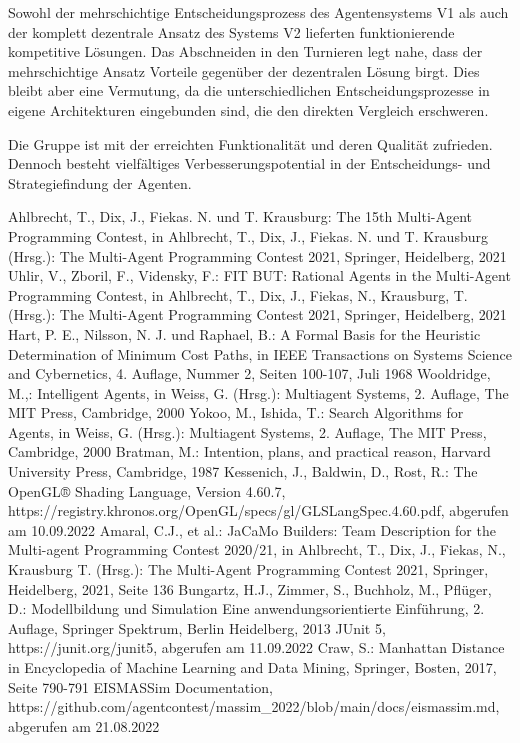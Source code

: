 \documentclass[runningheads]{llncs}
\begin{document}
	Sowohl der mehrschichtige Entscheidungsprozess des Agentensystems V1 als auch der komplett dezentrale Ansatz des Systems V2 lieferten funktionierende kompetitive Lösungen. Das Abschneiden in den Turnieren legt nahe, dass der mehrschichtige Ansatz Vorteile gegenüber der dezentralen Lösung birgt. Dies bleibt aber eine Vermutung, da die unterschiedlichen Entscheidungsprozesse in eigene Architekturen eingebunden sind, die den direkten Vergleich erschweren.
	
	Die Gruppe ist mit der erreichten Funktionalität und deren Qualität zufrieden. Dennoch besteht vielfältiges Verbesserungspotential in der Entscheidungs- und Strategiefindung der Agenten.
	
	\newpage\begin{thebibliography}{8}
		Ahlbrecht, T., Dix, J., Fiekas. N. und T. Krausburg: The 15th Multi-Agent Programming Contest, in Ahlbrecht, T., Dix, J., Fiekas. N. und T. Krausburg (Hrsg.): The Multi-Agent Programming Contest 2021, Springer, Heidelberg, 2021
		Uhlir, V., Zboril, F., Vidensky, F.: FIT BUT: Rational Agents in the Multi-Agent Programming Contest, in Ahlbrecht, T., Dix, J., Fiekas, N., Krausburg, T. (Hrsg.): The Multi-Agent Programming Contest 2021, Springer, Heidelberg, 2021
		Hart, P. E., Nilsson, N. J. und Raphael, B.: A Formal Basis for the Heuristic Determination of Minimum Cost Paths, in IEEE Transactions on Systems Science and Cybernetics, 4. Auflage, Nummer 2, Seiten 100-107, Juli 1968
		Wooldridge, M.,: Intelligent Agents, in Weiss, G. (Hrsg.): Multiagent Systems, 2. Auflage, The MIT Press, Cambridge, 2000
		Yokoo, M., Ishida, T.: Search Algorithms for Agents, in Weiss, G. (Hrsg.): Multiagent Systems, 2. Auflage, The MIT Press, Cambridge, 2000
		Bratman, M.: Intention, plans, and practical reason, Harvard University Press, Cambridge, 1987
		Kessenich, J., Baldwin, D., Rost, R.: The OpenGL® Shading Language, Version 4.60.7, https://registry.khronos.org/OpenGL/specs/gl/GLSLangSpec.4.60.pdf, abgerufen am 10.09.2022
		Amaral, C.J., et al.: JaCaMo Builders: Team Description for the Multi-agent Programming Contest 2020/21, in  Ahlbrecht, T., Dix, J., Fiekas, N., Krausburg T. (Hrsg.): The Multi-Agent Programming Contest 2021, Springer, Heidelberg, 2021, Seite 136
		Bungartz, H.J., Zimmer, S., Buchholz, M., Pflüger, D.: Modellbildung und Simulation Eine anwendungsorientierte Einführung, 2. Auflage, Springer Spektrum, Berlin Heidelberg, 2013
		JUnit 5, https://junit.org/junit5, abgerufen am 11.09.2022
		Craw, S.: Manhattan Distance in Encyclopedia of Machine Learning and Data Mining, Springer, Bosten, 2017, Seite 790-791
		EISMASSim Documentation, \\ https://github.com/agentcontest/massim\_2022/blob/main/docs/eismassim.md, abgerufen am 21.08.2022
	\end{thebibliography}
\end{document}
